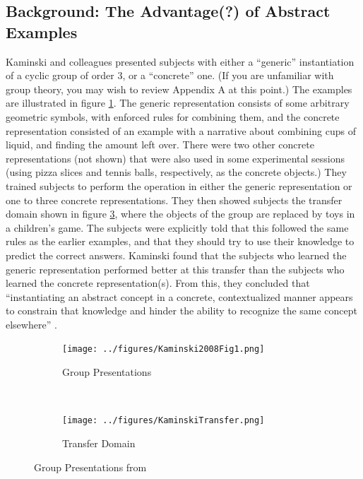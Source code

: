 \documentclass[11pt]{article}
\begin{document}
\subsection{Background: The Advantage(?) of Abstract Examples}
Kaminski and colleagues \cite{Kaminski2008} presented subjects with either a ``generic'' instantiation of a cyclic group of order 3, or a ``concrete'' one. (If you are unfamiliar with group theory, you may wish to review Appendix A at this point.) The examples are illustrated in figure \ref{kaminskitraining}. The generic representation consists of some arbitrary geometric symbols, with enforced rules for combining them, and the concrete representation consisted of an example with a narrative about combining cups of liquid, and finding the amount left over. There were two other concrete representations (not shown) that were also used in some experimental sessions (using pizza slices and tennis balls, respectively, as the concrete objects.) They trained subjects to perform the operation in either the generic representation or one to three concrete representations. They then showed subjects the transfer domain shown in figure \ref{kaminskitransfer}, where the objects of the group are replaced by toys in a children's game. The subjects were explicitly told that this followed the same rules as the earlier examples, and that they should try to use their knowledge to predict the correct answers. Kaminski found that the subjects who learned the generic representation performed better at this transfer than the subjects who learned the concrete representation(s). From this, they concluded that ``instantiating an abstract concept in a concrete, contextualized manner appears to constrain that knowledge and hinder the ability to recognize the same concept elsewhere'' \cite{Kaminski2008}. \\[11pt]
\begin{figure} \centering \begin{subfigure}{0.5\textwidth} \caption{Group Presentations} \label{kaminskitraining} \texttt{[image: ../figures/Kaminski2008Fig1.png]} \end{subfigure} \\ \begin{subfigure}{0.5\textwidth} \caption{Transfer Domain} \label{kaminskitransfer} \texttt{[image: ../figures/KaminskiTransfer.png]} \end{subfigure} \caption{Group Presentations from \cite{Kaminski2008}} \end{figure}\noindent
\end{document}
